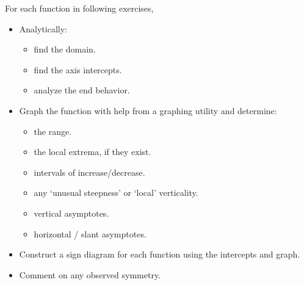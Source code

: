 \documentclass{ximera}
\begin{document}
For each function in following exercises,

\begin{itemize}

\item Analytically:



\begin{itemize}

\item find the domain.

\item find the axis intercepts.

\item analyze the end behavior.

\end{itemize}



\item Graph the function with help from a graphing utility and determine:



\begin{itemize}

\item  the range.

\item the local extrema, if they exist.

\end{itemize}





\begin{itemize}

\item intervals of increase/decrease.

\item any `unusual steepness' or `local' verticality.

\end{itemize}





\begin{itemize}

\item  vertical asymptotes.

\item  horizontal / slant asymptotes.

\end{itemize}



\item Construct a sign diagram for each function using the intercepts and graph.

\item  Comment on any observed symmetry.


\end{itemize}
\end{document}
